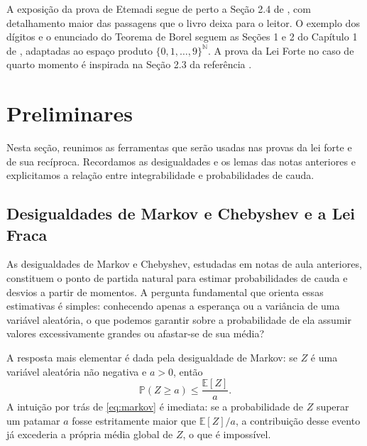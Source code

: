\documentclass[12pt,portuguese]{article}
\theoremstyle{definition}
\theoremstyle{plainexercise}
\theoremstyle{starredexercise}
\theoremstyle{definition}
\begin{document}
A exposição da prova de Etemadi segue de perto a Seção 2.4 de
\cite{MR3930614}, com detalhamento maior das passagens que o livro deixa
para o leitor. O exemplo dos dígitos e o enunciado do Teorema de Borel seguem as
Seções 1 e 2 do Capítulo 1 de \cite{MR2893652}, adaptadas ao espaço produto
$\{0,1,\ldots,9\}^{\mathbb{N}}$. A prova da Lei Forte no caso de quarto momento é 
inspirada na Seção 2.3 da referência \cite{MR3930614}.

\section{Preliminares}\label{sec:preliminares}

Nesta seção, reunimos as ferramentas que serão usadas nas provas da lei forte
e de sua recíproca. Recordamos as desigualdades e os lemas das notas anteriores
e explicitamos a relação entre integrabilidade e probabilidades de cauda.

\subsection{Desigualdades de Markov e Chebyshev e a Lei Fraca}\label{subsec:markov-chebyshev}

As desigualdades de Markov e Chebyshev, estudadas em notas de aula anteriores,
constituem o ponto de partida natural para estimar probabilidades de cauda e
desvios a partir de momentos. A pergunta fundamental que orienta essas
estimativas é simples: conhecendo apenas a esperança ou a variância de uma
variável aleatória, o que podemos garantir sobre a probabilidade de ela assumir
valores excessivamente grandes ou afastar-se de sua média?

A resposta mais elementar é dada pela desigualdade de Markov: se $Z$ é uma
variável aleatória não negativa e $a>0$, então
\begin{equation}\label{eq:markov}
\mathbb{P}(Z\geqslant a)\leqslant\frac{\mathbb{E}[Z]}{a}.
\end{equation}
A intuição por trás de \eqref{eq:markov} é imediata: se a probabilidade de $Z$
superar um patamar $a$ fosse estritamente maior que $\mathbb{E}[Z]/a$, a
contribuição desse evento já excederia a própria média global de $Z$, o que é
impossível.
\end{document}
